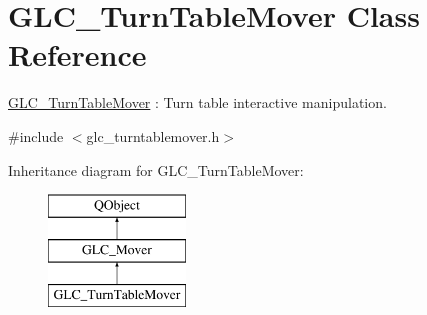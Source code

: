 \hypertarget{class_g_l_c___turn_table_mover}{\section{G\-L\-C\-\_\-\-Turn\-Table\-Mover Class Reference}
\label{class_g_l_c___turn_table_mover}
}


\hyperlink{class_g_l_c___turn_table_mover}{G\-L\-C\-\_\-\-Turn\-Table\-Mover} \-: Turn table interactive manipulation.  




{\ttfamily \#include $<$glc\-\_\-turntablemover.\-h$>$}

Inheritance diagram for G\-L\-C\-\_\-\-Turn\-Table\-Mover\-:\begin{figure}[H]
\begin{center}
\leavevmode
\includegraphics[height=3.000000cm]{class_g_l_c___turn_table_mover}
\end{center}
\end{figure}
